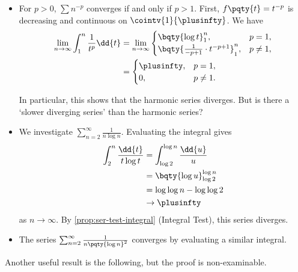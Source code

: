 \begin{examples}
    \label{ex:integral-test}%
    \begin{itemize}
        \item For \(p > 0\), \(\sum n^{-p}\) converges if and only if \(p > 1\). First, \(f\pqty{t} = t^{-p}\) is decreasing and continuous on \(\cointv{1}{\plusinfty}\). We have
        \begin{align*}
            \lim_{n \to \infty} \int_{1}^{n} \frac{1}{t^p} \dd{t} &= \lim_{n \to \infty} \begin{cases}
                \bqty{\log t}_{1}^{n}, & p = 1, \\
                \bqty{\frac{1}{-p + 1} \cdot t^{-p + 1}}_{1}^{n}, & p \neq 1, \\
            \end{cases} \\
            &= \begin{cases}
                \plusinfty, & p = 1, \\
                0, & p \neq 1.
            \end{cases}
        \end{align*}

        In particular, this shows that the harmonic series diverges. But is there a `slower diverging series' than the harmonic series?

        \item We investigate \(\sum_{n = 2}^{\infty} \frac{1}{n \log n}\). Evaluating the integral gives
        \begin{align*}
            \int_{2}^{n} \frac{\dd{t}}{t \log t} &= \int_{\log 2}^{\log n} \frac{\dd{u}}{u} \\
            &= \bqty{\log u}_{\log 2}^{\log n} \\
            &= \log \log n - \log \log 2 \\
            &\to \plusinfty
        \end{align*}
        as \(n \to \infty\). By \autoref{prop:ser-test-integral} (Integral Test), this series diverges.

        \item The series \(\sum_{n = 2}^{\infty} \frac{1}{n \pqty{\log n}^2}\) converges by evaluating a similar integral.
    \end{itemize}
\end{examples}

Another useful result is the following, but the proof is non-examinable.

